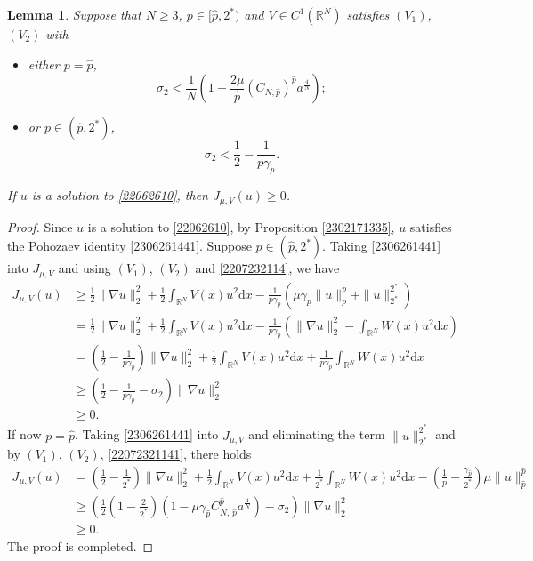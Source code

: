 \documentclass[10pt]{article}
\numberwithin{equation}{section}
\newtheorem{lemma}[theorem]{Lemma}
\newcommand{\ud}{\mathrm{d}}
\numberwithin{equation}{section}
\begin{document}
\begin{lemma}\label{2207241537}
Suppose that $N\ge 3$, $p\in [\hat{p}, 2^*)$ and $V\in C^1(\mathbb{R}^N)$ satisfies $(V_1)$, $(V_2)$ with
\begin{itemize}
\item[$(i)$] either $p=\hat{p}$,
\begin{equation}\label{22072321141}
\sigma_2 < \frac{1}{N}\left(1-\frac{2\mu}{\hat{p}}(C_{N, \hat{p}})^{\hat{p}}a^{\frac4N}\right);
\end{equation}
\item[$(ii)$] or $p\in (\hat{p}, 2^*)$,
\begin{equation}\label{2207232114}
\sigma_2 < \frac12-\frac{1}{p\gamma_p}.
\end{equation}
\end{itemize}
If $u$ is a solution to \eqref{22062610}, then $J_{\mu, V}(u)\ge 0$.
\end{lemma}
\begin{proof}
Since $u$ is a solution to \eqref{22062610}, by Proposition \ref{2302171335}, $u$ satisfies the Pohozaev identity \eqref{2306261441}.
Suppose $p\in (\hat{p}, 2^*)$. Taking \eqref{2306261441} into $J_{\mu, V}$ and using $(V_1)$, $(V_2)$ and \eqref{2207232114}, we have
\[
\begin{aligned}
J_{\mu, V}(u)&\ge \frac{1}{2}\|\nabla u\|_2^2
+\frac12 \int_{\mathbb{R}^N} V(x)u^2 \ud x-\frac{1}{p\gamma_p}\left(\mu \gamma_p \|u\|_p^p+\|u\|_{2^*}^{2^*}\right)\\
&= \frac{1}{2}\|\nabla u\|_2^2
+\frac12 \int_{\mathbb{R}^N} V(x)u^2 \ud x-\frac{1}{p\gamma_p}\left( \|\nabla u\|_2^2-\int_{\mathbb{R}^N} W(x)u^2 \ud x \right)\\
&= \left(\frac{1}{2}-\frac{1}{p\gamma_p}\right)\|\nabla u\|_2^2
+\frac12 \int_{\mathbb{R}^N} V(x)u^2 \ud x+\frac{1}{p\gamma_p}\int_{\mathbb{R}^N} W(x)u^2 \ud x\\
&\ge \left(\frac{1}{2}-\frac{1}{p\gamma_p}-\sigma_2\right)\|\nabla u\|_2^2\\
&\ge 0.
\end{aligned}
\]
If now $p=\hat{p}$. Taking \eqref{2306261441} into $J_{\mu, V}$ and eliminating the term $\|u\|_{2^*}^{2^*}$ and by $(V_1)$, $(V_2)$, \eqref{22072321141}, there holds
\[
\begin{aligned}
J_{\mu, V}(u)&= \left(\frac{1}{2}-\frac1{2^*}\right)\|\nabla u\|_2^2
+\frac12 \int_{\mathbb{R}^N} V(x)u^2 \ud x+\frac1{2^*} \int_{\mathbb{R}^N} W(x)u^2 \ud x-\left(\frac{1}{p} -\frac{\gamma_{\hat{p}}}{2^*}\right)\mu\|u\|_{\hat{p}}^{\hat{p}}
\\
&\ge \left( \frac12\left(1-\frac2{2^*}\right)\left(1-\mu \gamma_{\hat{p}}C_{N,\, {\hat{p}}}^{{\hat{p}}}a^{\frac4N}\right)-\sigma_2\right)\|\nabla u\|_2^2\\
&\ge 0.
\end{aligned}
\]
The proof is completed.
\end{proof}
\end{document}
